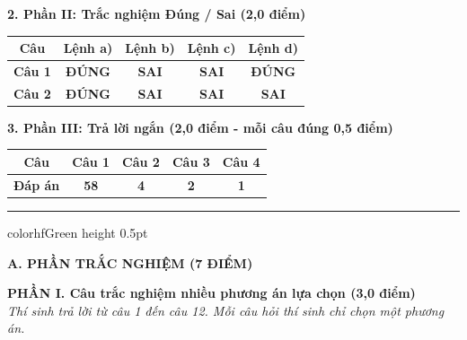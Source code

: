 \documentclass[11pt,a4paper]{article}
\begin{document}
\vspace{2pt}
\noindent
\textbf{\color{mainGreen}2. Phần II: Trắc nghiệm Đúng / Sai (2,0 điểm)}
\begin{center}
\renewcommand{\arraystretch}{1.2}
\begin{tabular}{|c|c|c|c|c|}
\hline
\rowcolor{tableGreen}
\textbf{Câu} & \textbf{Lệnh a)} & \textbf{Lệnh b)} & \textbf{Lệnh c)} & \textbf{Lệnh d)} \\
\hline
\textbf{Câu 1} & \textbf{\color{hfRed}ĐÚNG} & \textbf{\color{solBlue}SAI} & \textbf{\color{solBlue}SAI} & \textbf{\color{hfRed}ĐÚNG} \\
\hline
\textbf{Câu 2} & \textbf{\color{hfRed}ĐÚNG} & \textbf{\color{solBlue}SAI} & \textbf{\color{solBlue}SAI} & \textbf{\color{solBlue}SAI} \\
\hline
\end{tabular}
\end{center}

\vspace{2pt}
\noindent
\textbf{\color{mainGreen}3. Phần III: Trả lời ngắn (2,0 điểm - mỗi câu đúng 0,5 điểm)}
\begin{center}
\renewcommand{\arraystretch}{1.2}
\begin{tabular}{|c|c|c|c|c|}
\hline
\rowcolor{tableGreen}
\textbf{Câu} & \textbf{Câu 1} & \textbf{Câu 2} & \textbf{Câu 3} & \textbf{Câu 4} \\
\hline
\textbf{Đáp án} & \textbf{\color{hfRed}58} & \textbf{\color{hfRed}4} & \textbf{\color{hfRed}2} & \textbf{\color{hfRed}1} \\
\hline
\end{tabular}
\end{center}

\vspace{4pt}
\hrule color{hfGreen} height 0.5pt

\vspace{4pt}
\noindent
{\color{mainGreen}\textbf{\Large A. PHẦN TRẮC NGHIỆM (7 ĐIỂM)}}

\vspace{3pt}
\noindent
{\color{mainGreen}\textbf{\large PHẦN I. Câu trắc nghiệm nhiều phương án lựa chọn (3,0 điểm)}}\\
\textit{\small Thí sinh trả lời từ câu 1 đến câu 12. Mỗi câu hỏi thí sinh chỉ chọn một phương án.}
\vspace{2pt}
\end{document}
